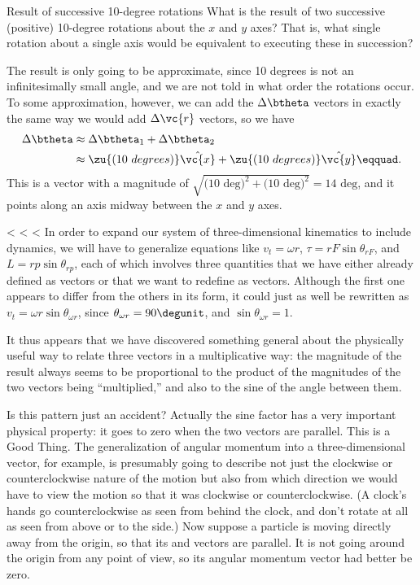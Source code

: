 \begin{eg}{Result of successive 10-degree rotations}
\egquestion
What is the result of two successive (positive)
10-degree rotations about the $x$ and  $y$ axes? That is, what
single rotation about a single axis would be equivalent to
executing these in succession?

\eganswer
The result is only going to be approximate, since
10 degrees is not an infinitesimally small angle, and we are
not told in what order the rotations occur. To some
approximation, however, we can add the $\Delta\btheta$ vectors in exactly
the same way we would add $\Delta \vc{r}$ vectors, so we
have
\begin{align*}
        \Delta\btheta        &\approx  \Delta\btheta_1 +  \Delta\btheta_2 \\
                &\approx  \zu{(10\ degrees)}\hat{\vc{x}} + \zu{(10\ degrees)}\hat{\vc{y}}\eqquad.
\end{align*}
This is a vector with a magnitude of  
$\sqrt{\text{(10 deg)}^2+\text{(10 deg)}^2}=\text{14\ deg}$, and it
points along an axis midway between the $x$ and $y$ axes.
\end{eg}

<%
<%
<%
In order to expand our system of three-dimensional
kinematics to include dynamics, we will have to generalize
equations like $v_t=\omega r$,
$\tau=rF \sin\theta_{rF}$, and $L=rp \sin\theta_{rp}$, each of which
involves three quantities that we have either already
defined as vectors or that we want to redefine as vectors.
Although the first one appears to differ from the others in
its form, it could just as well be rewritten as $v_t=\omega r \sin\theta_{\omega r}$, since $\theta_{\omega r}=90\degunit$, and
$\sin\theta_{\omega r}=1$.

It thus appears that we have discovered something general
about the physically useful way to relate three vectors in a
multiplicative way: the magnitude of the result always seems
to be proportional to the product of the magnitudes of the
two vectors being ``multiplied,'' and also to the sine of
the angle between them.

Is this pattern just an accident? Actually the sine factor
has a very important physical property: it goes to zero when
the two vectors are parallel. This is a Good Thing. The
generalization of angular momentum into a three-dimensional
vector, for example, is presumably going to describe not
just the clockwise or counterclockwise nature of the motion
but also from which direction we would have to view the
motion so that it was clockwise or counterclockwise. (A
clock's hands go counterclockwise as seen from behind the
clock, and don't rotate at all as seen from above or to the
side.) Now suppose a particle is moving directly away from
the origin, so that its  and  vectors are parallel. It is
not going around the origin from any point of view, so its
angular momentum vector had better be zero.

